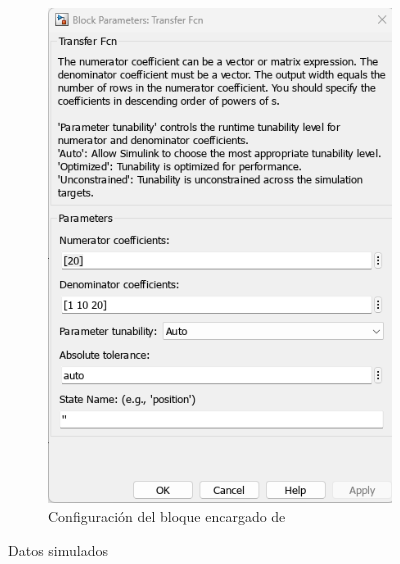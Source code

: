\begin{figure}[htbp]
\begin{subfigure}[b]{0.45\textwidth}
        \includegraphics[width=\textwidth]{fig/Capitulo5/Caso_de_estudio_PID/config_transfer_function.png}
        \caption{Configuración del bloque encargado de }
        \label{fig:oe_sim}
    \end{subfigure}
    \caption{Datos simulados}
    \label{fig:data_simulated}
\end{figure}

